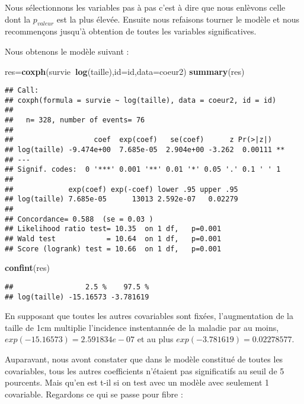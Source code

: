 \documentclass[
]{article}
\newenvironment{Shaded}{\begin{snugshade}}{\end{snugshade}}
\newcommand{\DataTypeTok}[1]{\textcolor[rgb]{0.13,0.29,0.53}{#1}}
\newcommand{\KeywordTok}[1]{\textcolor[rgb]{0.13,0.29,0.53}{\textbf{#1}}}
\newcommand{\NormalTok}[1]{#1}
\newcommand{\OperatorTok}[1]{\textcolor[rgb]{0.81,0.36,0.00}{\textbf{#1}}}
\begin{document}
Nous sélectionnons les variables pas à pas c'est à dire que nous
enlèvons celle dont la \(p_{valeur}\) est la plus élevée. Ensuite nous
refaisons tourner le modèle et nous recommençons jusqu'à obtention de
toutes les variables significatives.

Nous obtenons le modèle suivant :

\begin{Shaded}
\begin{Highlighting}[]
\NormalTok{res=}\KeywordTok{coxph}\NormalTok{(survie}\OperatorTok{~}\KeywordTok{log}\NormalTok{(taille),}\DataTypeTok{id=}\NormalTok{id,}\DataTypeTok{data=}\NormalTok{coeur2)}
\KeywordTok{summary}\NormalTok{(res)}
\end{Highlighting}
\end{Shaded}

\begin{verbatim}
## Call:
## coxph(formula = survie ~ log(taille), data = coeur2, id = id)
## 
##   n= 328, number of events= 76 
## 
##                   coef  exp(coef)   se(coef)      z Pr(>|z|)   
## log(taille) -9.474e+00  7.685e-05  2.904e+00 -3.262  0.00111 **
## ---
## Signif. codes:  0 '***' 0.001 '**' 0.01 '*' 0.05 '.' 0.1 ' ' 1
## 
##             exp(coef) exp(-coef) lower .95 upper .95
## log(taille) 7.685e-05      13013 2.592e-07   0.02279
## 
## Concordance= 0.588  (se = 0.03 )
## Likelihood ratio test= 10.35  on 1 df,   p=0.001
## Wald test            = 10.64  on 1 df,   p=0.001
## Score (logrank) test = 10.66  on 1 df,   p=0.001
\end{verbatim}

\begin{Shaded}
\begin{Highlighting}[]
\KeywordTok{confint}\NormalTok{(res)}
\end{Highlighting}
\end{Shaded}

\begin{verbatim}
##                 2.5 %    97.5 %
## log(taille) -15.16573 -3.781619
\end{verbatim}

En supposant que toutes les autres covariables sont fixées,
l'augmentation de la taille de 1cm multiplie l'incidence instentannée de
la maladie par au moins, \(exp(-15.16573)=2.591834e-07\) et au plus
\(exp(-3.781619)=0.02278577\).

Auparavant, nous avont constater que dans le modèle constitué de toutes
les covariables, tous les autres coefficients n'étaient pas
significatifs au seuil de 5 pourcents. Mais qu'en est t-il si on test
avec un modèle avec seulement 1 covariable. Regardons ce qui se passe
pour fibre :
\end{document}
